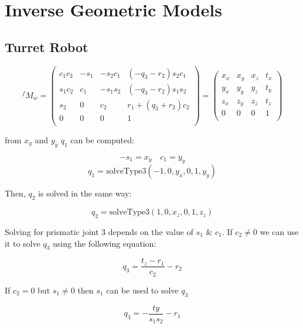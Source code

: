 \documentclass[11pt, oneside]{article}   	%
\begin{document}
\section{Inverse Geometric Models}

\subsection{Turret Robot}

\begin{equation*}
^fM_w= 
\begin{pmatrix}
c_1 c_2 & -s_1 & -s_2 c_1 & (-q_3 - r_2) s_2  c_1 \\
s_1 c_2& c_1 & -s_1 s_2& (-q_3 - r_2) s_1 s_2 \\
s_2  & 0  & c_2 & r_1 + (q_3 + r_2) c_2  \\
0 & 0 & 0 & 1\\
\end{pmatrix}
=
\begin{pmatrix}
x_x& x_y & x_z & t_x \\
y_x& y_y & y_z & t_y\\
z_x  & z_y  & z_z & t_z  \\
0 & 0 & 0 & 1\\
\end{pmatrix}
\end{equation*}

from $x_y$ and $y_y$ $q_1$ can be computed:

\begin{equation*}
-s_1 = x_y \quad c_1 = y_y
\end{equation*}
\begin{equation}
q_1 = \text{solveType3}(-1,0,y_x,0,1,y_y)
\end{equation}

Then, $q_2$ is solved in the same way:

\begin{equation}
q_2 = \text{solveType3}(1,0,x_z,0,1,z_z)
\end{equation}

Solving for prismatic joint 3 depends on the value of $s_1$ \& $c_1$. If $c_2 \neq 0$ we can use it to solve $q_3$ using the following equation:

\begin{equation}
q_3 = \frac{t_z-r_1}{c_2}-r_2
\end{equation} 

If $c_2 = 0$ but $s_1 \neq 0$ then $s_1$ can be used to solve $q_3$

\begin{equation}
q_3 = -\frac{ty}{s_1 s_2}-r_1
\end{equation}
\end{document}
